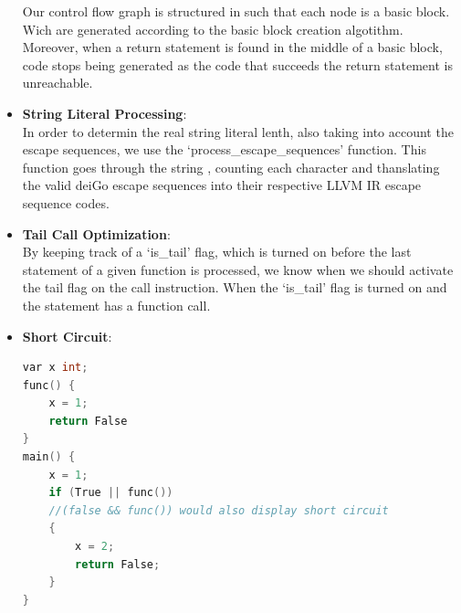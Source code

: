 \documentclass[12pt]{article}
\begin{document}
\begin{itemize}
\begin{center}
\end{center}
Our control flow graph is structured in such that each node is a basic block. Wich are generated according to the basic block creation algotithm. Moreover, when a return statement is found in the middle of a basic block, code stops being generated as the code that succeeds the return statement is unreachable. 


\item \textbf{String Literal Processing}: \\
In order to determin the real string literal lenth, also taking into account the escape sequences, we use the `process\_escape\_sequences' function. This function goes through the string , counting each character and thanslating the valid deiGo escape sequences into their respective LLVM IR escape sequence codes.

\item \textbf{Tail Call Optimization}: \\
By keeping track of a `is\_tail' flag, which is turned on before the last statement of a given function is processed, we know when we should activate the tail flag on the call instruction. When the `is\_tail' flag is turned on and the statement has a function call.


\item \textbf{Short Circuit}: 

\begin{center}
    \begin{lstlisting}[language=C, basicstyle=\small\ttfamily]
var x int;
func() {
    x = 1;
    return False
}
main() {
    x = 1; 
    if (True || func())
    //(false && func()) would also display short circuit
    {
        x = 2;
        return False;        
    }
}
    \end{lstlisting}
\end{center}


\end{itemize}
\end{document}
